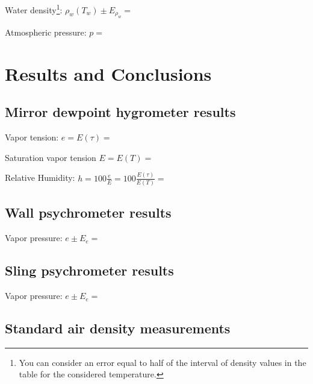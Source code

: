 \documentclass{article}
\begin{document}
\vspace{5mm}

Water density\footnote{You can consider an error equal to half of the interval of density values in the table for the considered temperature.}: $\rho_{w} ( T_{w} )\pm E_{\rho_w}=$
\underline{\hspace{2.5cm}}


\vspace{5mm}
Atmospheric pressure: $p =$ \underline{\hspace{4cm}} \hspace{2cm} 


\newpage
\section{Results and Conclusions}

\subsection{Mirror dewpoint hygrometer results}

Vapor tension: $e = E (\tau) = $ \underline{\hspace{4cm}}

\vspace{5mm}

Saturation vapor tension $E = E (T) =$ \underline{\hspace{4cm}}

\vspace{5mm}

Relative Humidity: $h =100\frac{e}{E} = 100\frac{E (\tau)}{E(T)} = $ \underline{\hspace{4cm}}
\subsection{Wall psychrometer results}

Vapor pressure: $e \pm E_e = $
\underline{\hspace{4cm}}

\subsection{Sling psychrometer results}

Vapor pressure: $e \pm E_e = $
\underline{\hspace{4cm}}
\subsection{Standard air density measurements}
\end{document}
